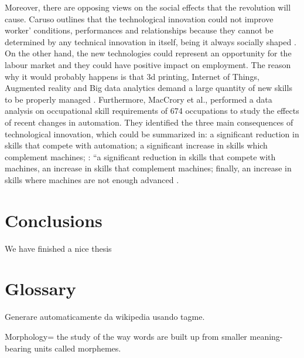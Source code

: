 \documentclass[]{book}
\begin{document}
Moreover, there are opposing views on the social effects that the
revolution will cause. Caruso outlines that the technological innovation
could not improve worker' conditions, performances and relationships
because they cannot be determined by any technical innovation in itself,
being it always socially shaped \citep{caruso2017digital}. On the other
hand, the new technologies could represent an opportunity for the labour
market and they could have positive impact on employment. The reason why
it would probably happens is that 3d printing, Internet of Things,
Augmented reality and Big data analytics demand a large quantity of new
skills to be properly managed \citep{freddi2017digitalisation}.
Furthermore, MacCrory et al., performed a data analysis on occupational
skill requirements of 674 occupations to study the effects of recent
changes in automation. They identified the three main consequences of
technological innovation, which could be summarized in: a significant
reduction in skills that compete with automation; a significant increase
in skills which complement machines; : ``a significant reduction in
skills that compete with machines, an increase in skills that complement
machines; finally, an increase in skills where machines are not enough
advanced \citep{maccrory2014racing}.

\chapter*{Conclusions}\label{conclusions}

We have finished a nice thesis

\chapter*{Glossary}\label{glossary}

Generare automaticamente da wikipedia usando tagme.

Morphology= the study of the way words are built up from smaller
meaning-bearing units called morphemes.


\end{document}
